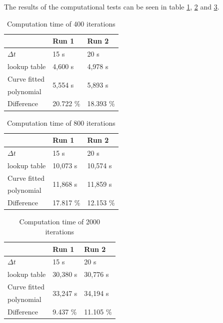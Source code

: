 The results of the computational tests can be seen in table \ref{400_it_comput}, \ref{800_it_comput} and \ref{2000_it_comput}.  

\begin{table}[H]
\centering
\begin{tabular}{|l|l|l|} \hline
	\rowcolor[HTML]{9B9B9B} 
			&  Run 1 & Run 2 \\ \hline
$\Delta t$ &	15 s & 20 s \\ \hline
lookup table &	4,600 s	&	4,978 s \\ \hline
Curve fitted  & \multirow{2}{*}{5,554 s} & \multirow{2}{*}{5,893 s} \\ 
polynomial    &						   &						\\ \hline
Difference    & 20.722 \%			   &  18.393 \% \\ \hline 
\end{tabular}
\caption{Computation time of 400 iterations}
\label{400_it_comput}
\end{table}

\begin{table}[H]
\centering
\begin{tabular}{|l|l|l|} \hline
	\rowcolor[HTML]{9B9B9B} 
			&  Run 1 & Run 2 \\ \hline
$\Delta t$ 		&	15 s		& 	20 s \\ \hline
lookup table 	&	10,073 s	&	10,574 s \\ \hline
Curve fitted  	& \multirow{2}{*}{11,868 s} & \multirow{2}{*}{11,859 s} \\ 
polynomial    &						   &						\\ \hline
Difference    & 17.817 \%			   &  12.153 \% \\ \hline 
\end{tabular}
\caption{Computation time of 800 iterations}
\label{800_it_comput}
\end{table}

\begin{table}[H]
\centering
\begin{tabular}{|l|l|l|} \hline
	\rowcolor[HTML]{9B9B9B} 
			&  Run 1 & Run 2 \\ \hline
$\Delta t$ 		&	15 s		& 	20 s \\ \hline
lookup table 	&	30,380 s	&	30,776 s  \\ \hline
Curve fitted 	& \multirow{2}{*}{33,247 s} & \multirow{2}{*}{34,194 s} \\ 
polynomial    	&						   &						\\ \hline
Difference    	& 9.437 \%			   &  11.105 \% \\ \hline 
\end{tabular}
\caption{Computation time of 2000 iterations}
\label{2000_it_comput}
\end{table}

